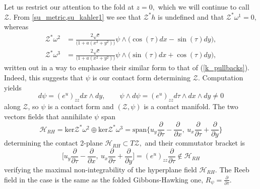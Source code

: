 \documentclass[a4paper,12pt, onecolumn, notitlepage]{article}
\theoremstyle{definition}
\theoremstyle{remark}
\newcommand{\w}{\omega}
\newcommand{\dd}[2]{\frac{\partial #1}{\partial #2}}
\begin{document}
Let us restrict our attention to the fold at $z=0,$ which we will continue to call $\mathcal{Z}.$ From \cref{su_metric,su_kahler1} we see that $\mathcal{Z}^{\ast}h$ is undefined and that $\mathcal{Z}^{\ast}\w^{1}=0,$ whereas
\begin{align*}
	\mathcal{Z}^{\ast}\w^{2}&=\frac{2\sqrt{c}}{\big(1+a(x^{2}+y^{2})\big)}\psi\wedge\big(\cos(\tau)dx - \sin(\tau)dy\big),\\
	\mathcal{Z}^{\ast}\w^{3}&=\frac{2\sqrt{c}}{\big(1+a(x^{2}+y^{2})\big)}\psi\wedge\big(\sin(\tau)dx + \cos(\tau)dy\big),
\end{align*}
written out in a way to emphasise their similar form to that of (\ref{k_pullbacks}). Indeed, this suggests that $\psi$ is our contact form determining $\mathcal{Z}.$ Computation yields
\begin{equation*}
	d\psi = (e^{u})_{zz}dx\wedge dy,\qquad \psi\wedge d\psi = (e^{u})_{zz}d\tau\wedge dx\wedge dy\neq 0
\end{equation*}
along $\mathcal{Z}$, so $\psi$ is a contact form and $(\mathcal{Z},\psi)$ is a contact manifold. The two vectors fields that annihilate $\psi$ span
\begin{equation*}
	\mathcal{H}_{RH}=\text{ker}\mathcal{Z}^{\ast}\w^{2}\oplus\text{ker}\mathcal{Z}^{\ast}\w^{3} = \text{span}\bigg\{  u_{y}\dd{}{\tau} - \dd{}{x},\ u_{x}\dd{}{\tau} + \dd{}{y}\bigg\}
\end{equation*}
determining the contact 2-plane $\mathcal{H}_{RH}\subset T\mathcal{Z},$ and their commutator bracket is
\begin{equation*}
	\bigg[u_{y}\dd{}{\tau} - \dd{}{x},\ u_{x}\dd{}{\tau} + \dd{}{y}\bigg] = (e^{u})_{zz}\dd{}{\tau}\not\in\mathcal{H}_{RH}
\end{equation*}
verifying the maximal non-integrability of the hyperplane field $\mathcal{H}_{RH}.$ The Reeb field in the case is the same as the folded Gibbons-Hawking one, $R_{\psi} = \dd{}{\tau}.$\\
\end{document}
